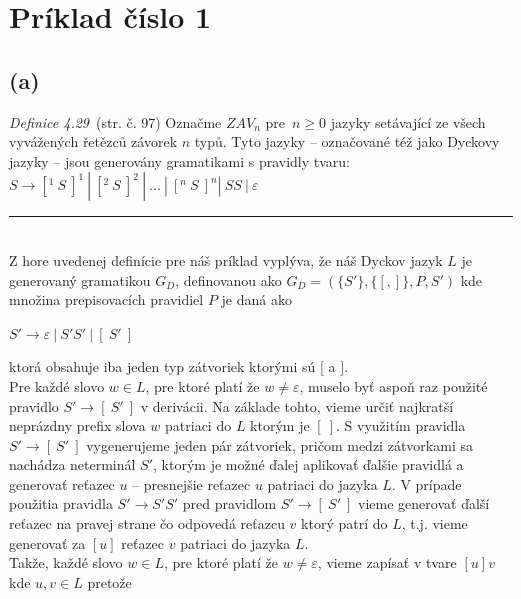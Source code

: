 \documentclass[11pt,a4paper]{article}
\begin{document}
\newpage
\section{Príklad číslo 1} %

\subsection{(a)}\label{sec:a}

\textit{Definice 4.29}~\cite{TIN}(str. č. 97) Označme $ZAV_n$ pre $n \geq 0$ jazyky setávající ze všech vyvážených řetězců závorek $n$ typů. Tyto jazyky -- označované též jako Dyckovy jazyky -- jsou generovány gramatikami s pravidly tvaru: $S \rightarrow [^{1}\ S\ ]^{1} \ |\  [^{2}\ S\ ]^{2} \ |\  ... \ |\  [^{n}\ S\ ]^{n} | \ SS \ | \ \varepsilon $

\rule{17cm}{0.4pt}

\hfill\\[-2em]

Z hore uvedenej definície pre náš príklad vyplýva, že náš Dyckov jazyk $L$ je generovaný gramatikou $G_{D}$, definovanou ako $G_{D} = (\{S'\},\{[,]\},P,S')$ kde množina prepisovacích pravidiel $P$ je daná ako

\begin{center}
$S' \rightarrow \varepsilon \ | \ S'S' \ | \ [\ S' \ ]$
\end{center}

ktorá obsahuje iba jeden typ zátvoriek ktorými sú $[$ a $]$.\\

Pre každé slovo $w \in L$, pre ktoré platí že $w \neq \varepsilon$, muselo byť aspoň raz použité pravidlo $S' \rightarrow [\ S' \ ]$ v derivácii. Na základe tohto, vieme určiť najkratší neprázdny prefix slova $w$ patriaci do $L$ ktorým je $[\ ]$. S využitím pravidla $S' \rightarrow [\ S' \ ]$ vygenerujeme jeden pár zátvoriek, pričom medzi zátvorkami sa nachádza neterminál $S'$, ktorým je možné ďalej aplikovať ďalšie pravidlá a generovať reťazec $u$ -- presnejšie reťazec $u$ patriaci do jazyka $L$. V prípade použitia pravidla $S' \rightarrow S'S'$ pred pravidlom $S' \rightarrow [\ S' \ ]$ vieme generovať ďalší reťazec na pravej strane čo odpovedá reťazcu $v$ ktorý patrí do $L$, t.j. vieme generovať za $[u]$ reťazec $v$ patriaci do jazyka $L$.\\

Takže, každé slovo $w \in L$, pre ktoré platí že $w \neq \varepsilon$, vieme zapísať v tvare $[u]v$ kde $u,v \in L$ pretože
\end{document}
